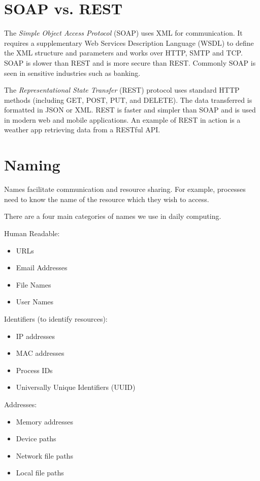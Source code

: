 
\section{SOAP vs. REST}
The \textit{Simple Object Access Protocol} (SOAP) uses XML for communication. It requires a supplementary Web Services Description Language (WSDL) to define the XML structure and parameters and works over HTTP, SMTP and TCP. SOAP is slower than REST and is more secure than REST. Commonly SOAP is seen in sensitive industries such as banking.

The \textit{Representational State Transfer} (REST) protocol uses standard HTTP methods (including GET, POST, PUT, and DELETE). The data transferred is formatted in JSON or XML. REST is faster and simpler than SOAP and is used in modern web and mobile applications. An example of REST in action is a weather app retrieving data from a RESTful API. 

\section{Naming}
Names facilitate communication and resource sharing. For example, processes need to know the name of the resource which they wish to access.

There are a four main categories of names we use in daily computing.

Human Readable:
\begin{itemize}
    \item URLs
    \item Email Addresses
    \item File Names
    \item User Names
\end{itemize}

Identifiers (to identify resources):
\begin{itemize}
    \item IP addresses
    \item MAC addresses
    \item Process IDs 
    \item Universally Unique Identifiers (UUID)
\end{itemize}

Addresses:
\begin{itemize}
    \item Memory addresses
    \item Device paths
    \item Network file paths
    \item Local file paths
\end{itemize}

